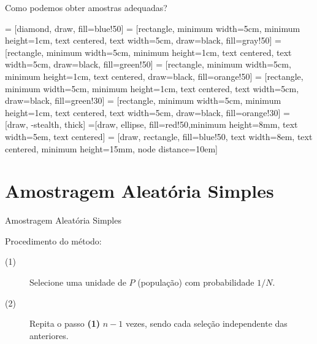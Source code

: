 \documentclass[14pt,aspectratio=1610]{beamer}
\begin{document}
\begin{frame}{Como podemos obter amostras adequadas?}
    \begin{block}{}
    \justifying
{} = [diamond, draw, fill=blue!50]
 = [rectangle, minimum width=5cm, minimum height=1cm, text centered, text width=5cm, draw=black, fill=gray!50]
 = [rectangle, minimum width=5cm, minimum height=1cm, text centered, text width=5cm, draw=black, fill=green!50]
 = [rectangle, minimum width=5cm, minimum height=1cm, text centered, draw=black, fill=orange!50]
 = [rectangle, minimum width=5cm, minimum height=1cm, text centered, text width=5cm, draw=black, fill=green!30]
 = [rectangle, minimum width=5cm, minimum height=1cm, text centered, text width=5cm, draw=black, fill=orange!30]
 = [draw, -stealth, thick]
=[draw, ellipse, fill=red!50,minimum height=8mm, text width=5em, text centered]
 = [draw, rectangle, fill=blue!50, text width=8em, text centered, minimum height=15mm, node distance=10em]
    \end{block}
\end{frame}

\section{Amostragem Aleatória Simples}
\begin{frame}{Amostragem Aleatória Simples}
\begin{block}{}
    \justifying
Procedimento do método:
\begin{description}
\item[(1)] Selecione uma unidade de $P$
(população) com probabilidade $1/N$.\pause
\item[(2)] Repita o passo \textbf{(1)} $n - 1$ vezes, sendo cada seleção independente das anteriores.
\end{description}
\end{block}
\end{frame}
\end{document}
